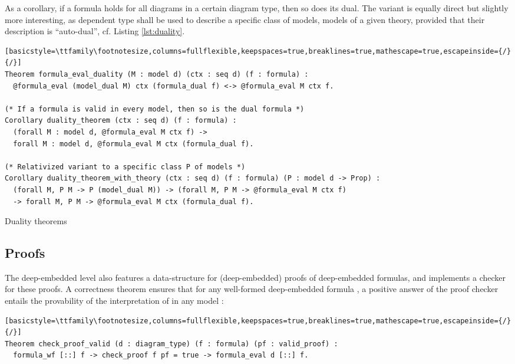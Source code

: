 As a corollary, if a formula holds for all diagrams in a certain diagram type, then so does its dual. The variant  is equally direct but slightly more interesting, as dependent type  shall be used to describe a specific class of models, \eg{} models of a given theory, provided that their description is \enquote{auto-dual}, cf. Listing \ref{lst:duality}.
\begin{listing}[h!]
\begin{lstlisting}[basicstyle=\ttfamily\footnotesize,columns=fullflexible,keepspaces=true,breaklines=true,mathescape=true,escapeinside={/}{/}]
Theorem formula_eval_duality (M : model d) (ctx : seq d) (f : formula) :
  @formula_eval (model_dual M) ctx (formula_dual f) <-> @formula_eval M ctx f.

(* If a formula is valid in every model, then so is the dual formula *)
Corollary duality_theorem (ctx : seq d) (f : formula) :
  (forall M : model d, @formula_eval M ctx f) ->
  forall M : model d, @formula_eval M ctx (formula_dual f).

(* Relativized variant to a specific class P of models *)
Corollary duality_theorem_with_theory (ctx : seq d) (f : formula) (P : model d -> Prop) :
  (forall M, P M -> P (model_dual M)) -> (forall M, P M -> @formula_eval M ctx f)
  -> forall M, P M -> @formula_eval M ctx (formula_dual f).
\end{lstlisting}
\caption{Duality theorems}\label{lst:duality}
\end{listing}



\subsection{Proofs}

The deep-embedded level also features a data-structure  for (deep-embedded) proofs of deep-embedded formulas, and implements a checker  for these proofs. A correctness theorem ensures that for any well-formed deep-embedded formula , a positive answer of the proof checker entails the provability of the interpretation of  in any model :
\begin{lstlisting}[basicstyle=\ttfamily\footnotesize,columns=fullflexible,keepspaces=true,breaklines=true,mathescape=true,escapeinside={/}{/}]
Theorem check_proof_valid (d : diagram_type) (f : formula) (pf : valid_proof) :
  formula_wf [::] f -> check_proof f pf = true -> formula_eval d [::] f.
\end{lstlisting}

